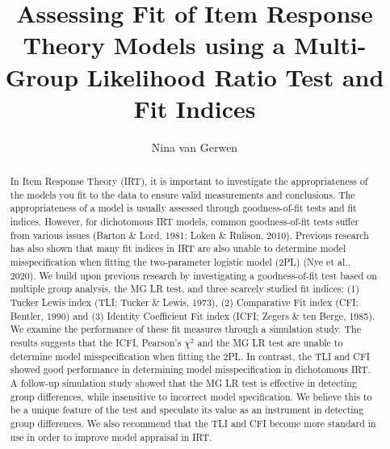 \documentclass[Royal,sageapa,times,doublespace]{sagej}
\begin{document}

\title{Assessing Fit of Item Response Theory Models using a Multi-Group Likelihood Ratio Test and Fit Indices}

\author{Nina van Gerwen } %




\begin{abstract}
In Item Response Theory (IRT), it is important to investigate the appropriateness of the models you fit to the data to ensure valid measurements and conclusions. The appropriateness of a model is usually assessed through goodness-of-fit tests and fit indices. However, for dichotomous IRT models, common goodness-of-fit tests suffer from various issues (Barton \& Lord, 1981; Loken \& Rulison, 2010). Previous research has also shown that many fit indices in IRT are also unable to determine model misspecification when fitting the two-parameter logistic model (2PL) (Nye et al., 2020). We build upon previous research by investigating a goodness-of-fit test based on multiple group analysis, the MG LR test, and three scarcely studied fit indices: (1) Tucker Lewis index (TLI; Tucker \& Lewis, 1973), (2) Comparative Fit index (CFI; Bentler, 1990) and (3) Identity Coefficient Fit index (ICFI; Zegers \& ten Berge, 1985). We examine the performance of these fit measures through a simulation study. The results suggests that the ICFI, Pearson's $\chi^2$ and the MG LR test are unable to determine model misspecification when fitting the 2PL. In contrast, the TLI and CFI showed good performance in determining model misspecification in dichotomous IRT. A follow-up simulation study showed that the MG LR test is effective in detecting group differences, while insensitive to incorrect model specification. We believe this to be a unique feature of the test and speculate its value as an instrument in detecting group differences. We also recommend that the TLI and CFI become more standard in use in order to improve model appraisal in IRT.
\end{abstract}

\end{document}
